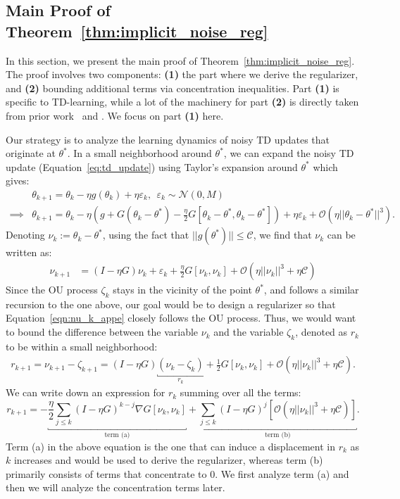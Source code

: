 \subsection{Main Proof of Theorem~\ref{thm:implicit_noise_reg}}
In this section, we present the main proof of Theorem~\ref{thm:implicit_noise_reg}. The proof involves two components: \textbf{(1)} the part where we derive the regularizer, and \textbf{(2)} bounding additional terms via concentration inequalities. Part \textbf{(1)} is specific to TD-learning, while a lot of the machinery for part \textbf{(2)} is directly taken from prior work~\citep{damian2021label} and \citet{blanc2020implicit}. We focus on part \textbf{(1)} here.

Our strategy is to analyze the learning dynamics of noisy TD updates that originate at $\theta^*$. In a small neighborhood around $\theta^*$, we can expand the noisy TD update (Equation~\ref{eq:td_update}) using Taylor's expansion around $\theta^*$ which gives:
\begin{align}
    \label{eqn:nu_k_app}
    &\theta_{k+1} = \theta_k - \eta g(\theta_k)+ \eta \varepsilon_k, ~~ \varepsilon_k \sim \mathcal{N}(0, M)\\
    \implies &\theta_{k+1} = \theta_k - \eta \left( g + G (\theta_k - \theta^*) - \frac{\eta}{2} G [\theta_k - \theta^*, \theta_k - \theta^*] \right) + \eta \varepsilon_k + \mathcal{O}(\eta ||\theta_k - \theta^*||^3).
\end{align}
Denoting $\nu_k := \theta_k - \theta^*$, using the fact that $||g(\theta^*)|| \leq \mathscr{C}$, we find that $\nu_k$ can be written as:
\begin{align}
\label{eqn:nu_k_appe}
    \nu_{k+1} &= (I - \eta G) \nu_k + \varepsilon_k + \frac{\eta}{2} G [\nu_k, \nu_k] + \mathcal{O}(\eta ||\nu_k||^3 + \eta\mathscr{C})
\end{align}
Since the OU process $\zeta_k$ stays in the vicinity of the point $\theta^*$, and follows a similar recursion to the one above, our goal would be to design a regularizer so that Equation~\ref{eqn:nu_k_appe} closely follows the OU process. Thus, we would want to bound the difference between the variable $\nu_k$ and the variable $\zeta_k$, denoted as $r_k$ to be within a small neighborhood:
\begin{align*}
r_{k+1} = \nu_{k+1} - \zeta_{k+1} = (I - \eta G) \underbracket{(\nu_k - \zeta_k)}_{r_k} + \frac{1}{2} G [\nu_k, \nu_k] + \mathcal{O}(\eta ||\nu_k||^3 + \eta \mathscr{C}). 
\end{align*}
We can write down an expression for $r_k$ summing over all the terms:
\begin{equation}
\label{eqn:r_k}
    r_{k+1} = - \underbracket{\frac{\eta}{2} \sum_{j \leq k} (I - \eta G)^{k - j} \nabla G [\nu_k, \nu_k]}_{\text{term (a)}} + \underbracket{\sum_{j \leq k} (I - \eta G)^j \left[\mathcal{O}(\eta ||\nu_k||^3 + \eta \mathscr{C}) \right]}_{\text{term (b)}}.
\end{equation}
Term (a) in the above equation is the one that can induce a displacement in $r_k$ as $k$ increases and would be used to derive the regularizer, whereas term (b) primarily consists of terms that concentrate to $0$. We first analyze term (a) and then we will analyze the concentration terms later. 


